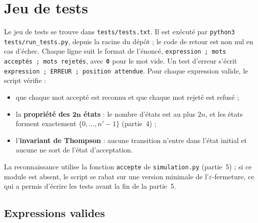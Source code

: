 \documentclass[12pt,a4paper]{article}
\newcommand{\code}[1]{{\fontsize{10}{12}\selectfont\texttt{#1}}}
\newcommand{\eps}{\ensuremath{\varepsilon}}
\newcommand{\tok}[1]{\ensuremath{\text{\fontsize{10}{12}\selectfont\ttfamily #1}}}
\begin{document}
\section{Jeu de tests}\label{sec:tests}

Le jeu de tests se trouve dans \code{tests/tests.txt}. Il est exécuté par
\code{python3 tests/run\_tests.py}, depuis la racine du dépôt ; le code de retour est non nul
en cas d'échec. Chaque ligne suit le format de l'énoncé,
\code{expression ; mots acceptés ; mots rejetés}, avec \tok{@} pour le mot vide. Un test
d'erreur s'écrit \code{expression ; ERREUR ; position attendue}. Pour chaque expression
valide, le script vérifie :
\begin{itemize}
\item que chaque mot accepté est reconnu et que chaque mot rejeté est refusé ;
\item la \textbf{propriété des $\boldsymbol{2n}$ états} : le nombre d'états est au plus $2n$, et
  les états forment exactement $\{0, \dots, n'-1\}$ (partie~4) ;
\item l'\textbf{invariant de Thompson} : aucune transition n'entre dans l'état initial et aucune
  ne sort de l'état d'acceptation.
\end{itemize}
La reconnaissance utilise la fonction \code{accepte} de \code{simulation.py} (partie~5) ; si ce
module est absent, le script se rabat sur une version minimale de l'\eps-fermeture, ce qui a permis
d'écrire les tests avant la fin de la partie~5.

\subsection{Expressions valides}
\end{document}
